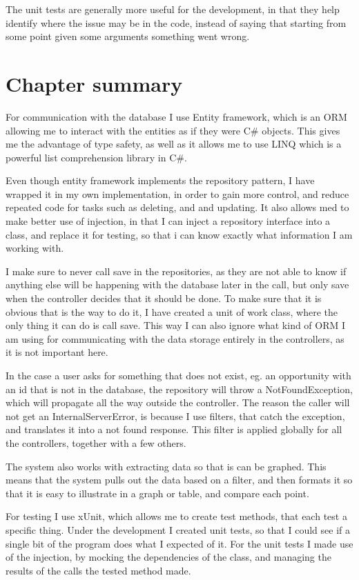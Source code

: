 The unit tests are generally more useful for the development, in that they help
identify where the issue may be in the code, instead of saying that starting
from some point given some arguments something went wrong.

\section{Chapter summary}
For communication with the database I use Entity framework, which is an ORM
allowing me to interact with the entities as if they were C\# objects. This
gives me the advantage of type safety, as well as it allows me to use LINQ which
is a powerful list comprehension library in C\#.

Even though entity framework implements the repository pattern, I have wrapped
it in my own implementation, in order to gain more control, and reduce repeated
code for tasks such as deleting, and and updating. It also allows med to make
better use of injection, in that I can inject a repository interface into a
class, and replace it for testing, so that i can know exactly what information I
am working with.

I make sure to never call save in the repositories, as they are not able to know
if anything else will be happening with the database later in the call, but only
save when the controller decides that it should be done. To make sure that it is
obvious that is the way to do it, I have created a unit of work class, where the
only thing it can do is call save. This way I can also ignore what kind of ORM I
am using for communicating with the data storage entirely in the controllers, as
it is not important here.

In the case a user asks for something that does not exist, eg. an opportunity
with an id that is not in the database, the repository will throw a
NotFoundException, which will propagate all the way outside the controller. The
reason the caller will not get an InternalServerError, is because I use filters,
that catch the exception, and translates it into a not found response. This
filter is applied globally for all the controllers, together with a few others.

The system also works with extracting data so that is can be graphed. This means
that the system pulls out the data based on a filter, and then formats it so
that it is easy to illustrate in a graph or table, and compare each point.

For testing I use xUnit, which allows me to create test methods, that each test
a specific thing. Under the development I created unit tests, so that I could
see if a single bit of the program does what I expected of it. For the unit
tests I made use of the injection, by mocking the dependencies of the class, and
managing the results of the calls the tested method made.

